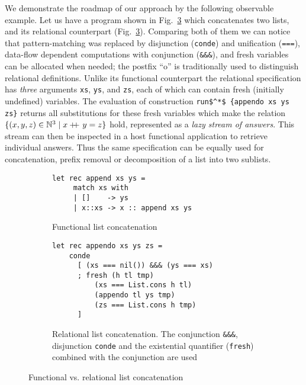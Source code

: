 We demonstrate the roadmap of our approach by the following observable example. Let us have a program
shown in Fig.~\ref{fun_vs_rel} which concatenates two lists,
and its relational counterpart (Fig.~\ref{fun_vs_rel}).
Comparing both of them we can notice that pattern-matching was replaced by disjunction (\lstinline[language=ocanren,basicstyle=\small]|conde|)
and unification (\lstinline[language=ocanren,basicstyle=\small]|===|), data-flow dependent computations with conjunction (\lstinline[language=ocanren,basicstyle=\small]|&&&|),
and fresh variables can be allocated when needed; the postfix ``o'' is traditionally used to distinguish relational definitions.
Unlike its functional
counterpart the relational specification has \emph{three} arguments \lstinline[language=ocanren,basicstyle=\small]|xs|, \lstinline[language=ocanren,basicstyle=\small]|ys|,
and \lstinline[language=ocanren,basicstyle=\small]|zs|, each of which can contain fresh (initially undefined) variables.
The evaluation of construction \lstinline[language=ocanren,basicstyle=\small]|run$^*$ {appendo xs ys zs}| returns all substitutions for these
fresh variables which make the relation $\{(x,y,z)\in\mathbb{N}^3 \mid x +\kern-1.3ex+\kern0.8ex y=z\}$ hold, represented as a \emph{lazy stream of answers}. This stream can
then be inspected in a host functional application to retrieve individual answers.
Thus the same specification can be equally used for concatenation,
prefix removal or decomposition of a list into two sublists.

\begin{figure}[t]
  \begin{subfigure}[t]{0.5\textwidth}
  \begin{lstlisting}[language=ocanren,basicstyle=\small]
   let rec append xs ys =
     match xs with
     | []    -> ys
     | x::xs -> x :: append xs ys
  \end{lstlisting}
  \caption{Functional list concatenation}
  \label{funadd}
  \end{subfigure}
  \begin{subfigure}[t]{0.5\textwidth}
    \begin{lstlisting}[language=ocanren,basicstyle=\small]
  let rec appendo xs ys zs =
    conde
      [ (xs === nil()) &&& (ys === xs)
      ; fresh (h tl tmp)
          (xs === List.cons h tl)
          (appendo tl ys tmp)
          (zs === List.cons h tmp)
      ]
    \end{lstlisting}
    \caption{Relational list concatenation. The conjunction \texttt{\&\&\&}, disjunction \texttt{conde} and the existential quantifier (\texttt{fresh}) combined with the conjunction are used}
    \label{reladd}
  \end{subfigure}
  \caption{Functional vs. relational list concatenation}
  \label{fun_vs_rel}
\end{figure}
